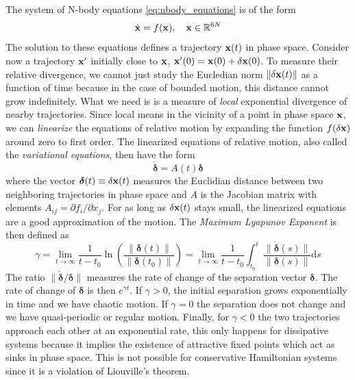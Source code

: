 \documentclass[twoside,openright,titlepage,numbers=noenddot,headinclude,%
                footinclude=true,cleardoublepage=empty,abstractoff, 
                BCOR=5mm,paper=a4,fontsize=11pt,%
                american,%
                ]{scrreprt}%
\begin{document}
The system of N-body equations \cref{eq:nbody_equations} is of the form
\begin{equation}
    \dot{\boldsymbol{\mathbf{x}}}=f(\boldsymbol{\mathbf{x}}),\quad\boldsymbol{\mathbf{x}}\in\mathbb{R}^{6N}
    \label{eq:nbody_eq_general}
\end{equation}
The solution to these equations defines a trajectory $\boldsymbol{\mathbf{x}}(t)$ in phase space.
Consider now a trajectory $\boldsymbol{\mathbf{x}}'$ initially close to $\boldsymbol{\mathbf{x}}$,
$\boldsymbol{\mathbf{x}}'(0)=\boldsymbol{\mathbf{x}}(0)+\delta\boldsymbol{\mathbf{x}}(0)$. To measure their relative divergence,
we cannot just study the Eucledian norm $\lVert \delta\boldsymbol{\mathbf{x}}(t)\rVert$ as 
a function of time because in the case of bounded motion, this distance cannot
grow indefinitely. What we need is is a measure of \emph{local} exponential
divergence of nearby trajectories. Since local means in the vicinity of a point
in phase space $\boldsymbol{\mathbf{x}}$, we can \emph{linearize} the equations
of relative motion by expanding the function $f(\delta\boldsymbol{\mathbf{x}})$ around
zero to first order. The linearized equations of relative motion, also called
the \emph{variational equations}, then have the form
\begin{equation}
    \dot{\boldsymbol{\delta}}=A(t)\boldsymbol{\delta}
    \label{eq:variational_equations}
\end{equation}
where the vector $\boldsymbol{\delta}(t)\equiv\delta\boldsymbol{\mathbf{x}}(t)$ measures the
Euclidian distance between two neighboring trajectories in phase space
and $A$ is the Jacobian matrix with elements $A_{ij}=\partial f_i/\partial x_j$.
For as long as $\delta\boldsymbol{\mathbf{x}}(t)$
stays small, the linearized equations are a good approximation of the motion. The
\emph{Maximum Lyapunov Exponent} is then defined as \citep{Hinse2010,morbidelli2002}
\begin{equation}
    \gamma=\lim_{t\rightarrow\infty} \frac{1}{t-t_0} \ln\left( \frac{\lVert 
    \boldsymbol{\delta}(t)\rVert}{\lVert \boldsymbol{\delta}(t_0)\rVert}\right)=
    \lim_{t\rightarrow\infty} \frac{1}{t-t_0}\int^t_{t_0} 
    \frac{\lVert \dot{\boldsymbol{\delta}}(s)\rVert}{\lVert 
    \boldsymbol{\delta}(s)\rVert}\mathrm{d}s
\end{equation}
 The ratio $\lVert\dot{\boldsymbol{\delta}}/ \boldsymbol{\delta}\rVert$ measures the
rate of change of the separation vector $\boldsymbol{\delta}$. The rate of change
of $\boldsymbol{\delta}$ is then $e^{\gamma t}$. If $\gamma >0$, the initial separation
grows exponentially in time and we have chaotic motion. If $\gamma=0$ the separation
does not change and we have quasi-periodic or regular motion. Finally, for $\gamma<0$
the two trajectories approach each other at an exponential rate, this only happens
for dissipative systems because it implies the existence of attractive fixed points which
act as sinks in phase space. This is not possible for conservative Hamiltonian
systems since it is a violation of Liouville's theorem. 
\end{document}
